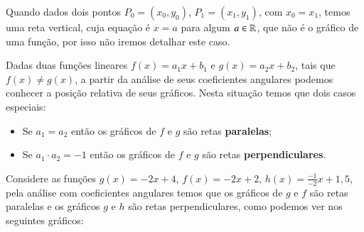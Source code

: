 \begin{itemize}
\begin{exem}
  \end{exem}
  
  Quando dados dois pontos $P_0=(x_0, y_0)$, $P_1=(x_1, y_1)$, com $x_0 = x_1$, temos uma reta vertical, cuja equação é $x= a$ para algum $a \in \mathbb{R}$, que não é o gráfico de uma função, por isso não iremos detalhar este caso.
  
  Dadas duas funções lineares $f(x)=a_1 x + b_1$ e $g(x)= a_2 x + b_2$, tais que $f(x) \neq g(x)$, a partir da análise de seus coeficientes angulares podemos conhecer a posição relativa de seus gráficos. Nesta situação temos que dois casos especiais:
  \begin{itemize}
  \item Se $a_1= a_2$ então os gráficos de $f$ e $g$ são retas \textbf{paralelas};
  \item Se $a_1 \cdot a_2= -1$ então os gráficos de $f$ e $g$ são retas \textbf{perpendiculares}.
  \end{itemize}
  
  \begin{exem}
  Considere as funções $g(x)= -2x+4$, $f(x)= -2x+2$, $h(x)= \frac{-1}{-2}x+ 1,5$, pela análise com coeficientes angulares temos que os gráficos de $g$ e $f$ são retas paralelas e os gráficos $g$ e $h$ são retas perpendiculares, como podemos ver nos seguintes gráficos:
     \begin{figure}[H]
  \end{figure} 
  \end{exem}


\end{itemize}
